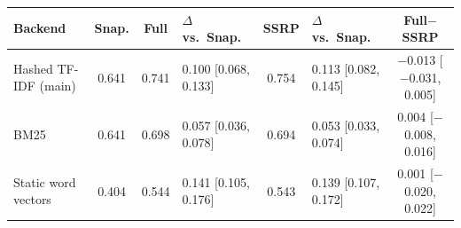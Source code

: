 \begin{tabular}{lcclclc}
\toprule
Backend & Snap. & Full & $\Delta$ vs.\ Snap. & SSRP & $\Delta$ vs.\ Snap. & Full$-$SSRP \\
\midrule
Hashed TF-IDF (main) & 0.641 & 0.741 & 0.100 [0.068, 0.133] & 0.754 & 0.113 [0.082, 0.145] & $-$0.013 [$-$0.031, 0.005] \\
BM25 & 0.641 & 0.698 & 0.057 [0.036, 0.078] & 0.694 & 0.053 [0.033, 0.074] & 0.004 [$-$0.008, 0.016] \\
Static word vectors & 0.404 & 0.544 & 0.141 [0.105, 0.176] & 0.543 & 0.139 [0.107, 0.172] & 0.001 [$-$0.020, 0.022] \\
\bottomrule
\end{tabular}